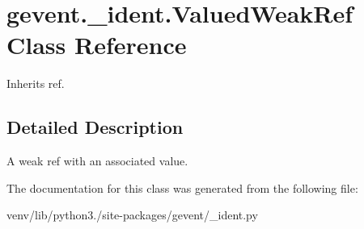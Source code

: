\hypertarget{classgevent_1_1__ident_1_1_valued_weak_ref}{}\section{gevent.\+\_\+ident.\+Valued\+Weak\+Ref Class Reference}
\label{classgevent_1_1__ident_1_1_valued_weak_ref}


Inherits ref.



\subsection{Detailed Description}
\begin{DoxyVerb}A weak ref with an associated value.
\end{DoxyVerb}
 

The documentation for this class was generated from the following file\+:\begin{DoxyCompactItemize}
\item 
venv/lib/python3./site-\/packages/gevent/\+\_\+ident.\+py\end{DoxyCompactItemize}
